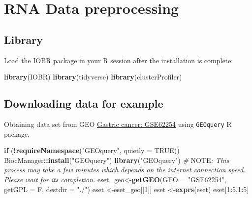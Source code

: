 \documentclass[
  12pt,
]{book}
\newenvironment{Shaded}{\begin{snugshade}}{\end{snugshade}}
\newcommand{\AlertTok}[1]{\textcolor[rgb]{0.94,0.16,0.16}{#1}}
\newcommand{\AttributeTok}[1]{\textcolor[rgb]{0.13,0.29,0.53}{#1}}
\newcommand{\CommentTok}[1]{\textcolor[rgb]{0.56,0.35,0.01}{\textit{#1}}}
\newcommand{\ConstantTok}[1]{\textcolor[rgb]{0.56,0.35,0.01}{#1}}
\newcommand{\ControlFlowTok}[1]{\textcolor[rgb]{0.13,0.29,0.53}{\textbf{#1}}}
\newcommand{\DecValTok}[1]{\textcolor[rgb]{0.00,0.00,0.81}{#1}}
\newcommand{\FunctionTok}[1]{\textcolor[rgb]{0.13,0.29,0.53}{\textbf{#1}}}
\newcommand{\NormalTok}[1]{#1}
\newcommand{\OtherTok}[1]{\textcolor[rgb]{0.56,0.35,0.01}{#1}}
\newcommand{\SpecialCharTok}[1]{\textcolor[rgb]{0.81,0.36,0.00}{\textbf{#1}}}
\newcommand{\StringTok}[1]{\textcolor[rgb]{0.31,0.60,0.02}{#1}}
\theoremstyle{definition}
\theoremstyle{definition}
\theoremstyle{definition}
\theoremstyle{definition}
\theoremstyle{remark}
\begin{document}
\hypertarget{rna-data-preprocessing}{%
\chapter{RNA Data preprocessing}\label{rna-data-preprocessing}}

\hypertarget{library}{%
\section{Library}\label{library}}

Load the IOBR package in your R session after the installation is complete:

\begin{Shaded}
\begin{Highlighting}[]
\FunctionTok{library}\NormalTok{(IOBR)}
\FunctionTok{library}\NormalTok{(tidyverse)}
\FunctionTok{library}\NormalTok{(clusterProfiler)}
\end{Highlighting}
\end{Shaded}

\hypertarget{downloading-data-for-example}{%
\section{Downloading data for example}\label{downloading-data-for-example}}

Obtaining data set from GEO \href{https://pubmed.ncbi.nlm.nih.gov/25894828/}{Gastric cancer: GSE62254} using \texttt{GEOquery} R package.

\begin{Shaded}
\begin{Highlighting}[]
\ControlFlowTok{if}\NormalTok{ (}\SpecialCharTok{!}\FunctionTok{requireNamespace}\NormalTok{(}\StringTok{"GEOquery"}\NormalTok{, }\AttributeTok{quietly =} \ConstantTok{TRUE}\NormalTok{))  BiocManager}\SpecialCharTok{::}\FunctionTok{install}\NormalTok{(}\StringTok{"GEOquery"}\NormalTok{)}
\FunctionTok{library}\NormalTok{(}\StringTok{"GEOquery"}\NormalTok{)}
\CommentTok{\# }\AlertTok{NOTE}\CommentTok{: This process may take a few minutes which depends on the internet connection speed. Please wait for its completion.}
\NormalTok{eset\_geo}\OtherTok{\textless{}{-}}\FunctionTok{getGEO}\NormalTok{(}\AttributeTok{GEO     =} \StringTok{"GSE62254"}\NormalTok{, }\AttributeTok{getGPL  =}\NormalTok{ F, }\AttributeTok{destdir =} \StringTok{"./"}\NormalTok{)}
\NormalTok{eset    }\OtherTok{\textless{}{-}}\NormalTok{eset\_geo[[}\DecValTok{1}\NormalTok{]]}
\NormalTok{eset    }\OtherTok{\textless{}{-}}\FunctionTok{exprs}\NormalTok{(eset)}
\NormalTok{eset[}\DecValTok{1}\SpecialCharTok{:}\DecValTok{5}\NormalTok{,}\DecValTok{1}\SpecialCharTok{:}\DecValTok{5}\NormalTok{]}
\end{Highlighting}
\end{Shaded}
\end{document}
